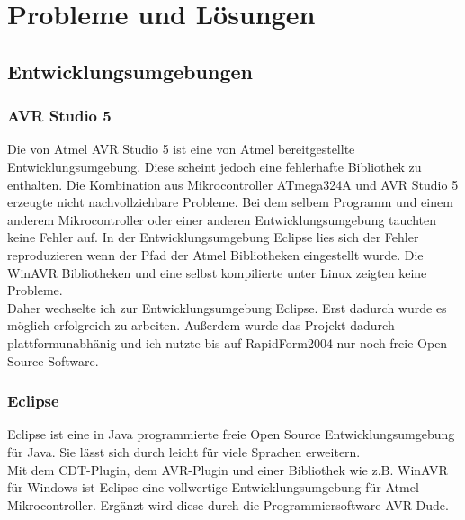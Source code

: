 \chapter{Probleme und Lösungen}
\section{Entwicklungsumgebungen}
\subsection{AVR Studio 5}
Die von Atmel AVR Studio 5 ist eine von Atmel bereitgestellte Entwicklungsumgebung. Diese scheint jedoch eine fehlerhafte Bibliothek zu enthalten. Die Kombination aus Mikrocontroller ATmega324A und AVR Studio 5 erzeugte nicht nachvollziehbare Probleme. Bei dem selbem Programm und einem anderem Mikrocontroller oder einer anderen Entwicklungsumgebung tauchten keine Fehler auf.
In der Entwicklungsumgebung Eclipse lies sich der Fehler reproduzieren wenn der Pfad der Atmel Bibliotheken eingestellt wurde. Die WinAVR Bibliotheken und eine selbst kompilierte  unter Linux zeigten keine Probleme.\\
Daher wechselte ich zur  Entwicklungsumgebung Eclipse. Erst dadurch wurde es möglich erfolgreich zu arbeiten. Außerdem wurde das Projekt dadurch plattformunabhänig und ich nutzte bis auf RapidForm2004 nur noch freie Open Source Software.\\
\subsection{Eclipse}
Eclipse ist eine in Java programmierte freie Open Source Entwicklungsumgebung für Java. Sie lässt sich durch  leicht für viele Sprachen erweitern.\\
Mit dem CDT-Plugin, dem AVR-Plugin und einer Bibliothek wie z.B. WinAVR für Windows ist Eclipse eine vollwertige Entwicklungsumgebung für Atmel Mikrocontroller. 
Ergänzt wird diese durch die Programmiersoftware AVR-Dude.\\




